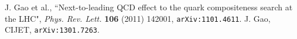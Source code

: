 \documentclass[aps,prd,preprint,nofootinbib]{revtex4}
\begin{document}
%

\begin{thebibliography}{99}
J. Gao et al., ``Next-to-leading QCD effect to the quark compositeness search at the LHC",
\emph{Phys. Rev. Lett.} {\bf 106} (2011) 142001, {\tt arXiv:1101.4611}.
J. Gao, CIJET, {\tt arXiv:1301.7263}.
\end{thebibliography}
\end{document}
